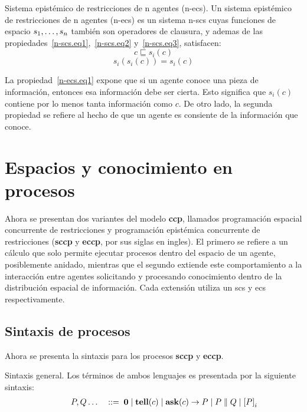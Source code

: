 \theoremstyle{definition}
\begin{definition}{Sistema epist\'emico de restricciones de n agentes (n-ecs).}
Un sistema epist\'emico de restricciones de n agentes (n-ecs) es un sistema n-scs cuyas funciones de espacio $s_1, \mathellipsis, s_n$ tambi\'en son operadores de clausura, y ademas de las propiedades~\ref{n-scs.eq1},~\ref{n-scs.eq2} y~\ref{n-scs.eq3}, satisfacen:
\begin{equation} \label{n-ecs.eq1}
c \sqsubseteq s_i(c)
\end{equation}
\begin{equation} \label{n-ecs.eq2}
s_i(s_i(c))=s_i(c)
\end{equation}
\end{definition}

La propiedad~\ref{n-ecs.eq1} expone que si un agente conoce una pieza de informaci\'on, entonces esa informaci\'on debe ser cierta. Esto significa que $s_i(c)$ contiene por lo menos tanta informaci\'on como $c$. De otro lado, la segunda propiedad se refiere al hecho de que un agente es consiente de la informaci\'on que conoce. 

\section{Espacios y conocimiento en procesos}
\label{ecp.sccp}

Ahora se presentan dos variantes del modelo \textbf{ccp}, llamados programaci\'on espacial concurrente de restricciones y programaci\'on epist\'emica concurrente de restricciones (\textbf{sccp} y \textbf{eccp}, por sus siglas en ingles). El primero se refiere a un c\'alculo que solo permite ejecutar procesos dentro del espacio de un agente, posiblemente anidado, mientras que el segundo extiende este comportamiento a la interacci\'on entre agentes solicitando y procesando conocimiento dentro de la distribuci\'on espacial de informaci\'on. Cada extensi\'on utiliza un scs y ecs respectivamente.

\subsection{Sintaxis de procesos}
\label{spr.cap3}

Ahora se presenta la sintaxis para los procesos \textbf{sccp} y \textbf{eccp}.

\theoremstyle{definition}
\begin{definition}{Sintaxis general.}
Los t\'erminos de ambos lenguajes es presentada por la siguiente sintaxis:
\[
\begin{array}{rl}
 \ \ \ \  \ \ \ \ P,Q\ldots & \; ::= \;\Stop\mid \tell(c) \mid \ask(c)\rightarrow P \mid P
\parallel Q  \mid \K i P 
\end{array}
\]
\end{definition}

